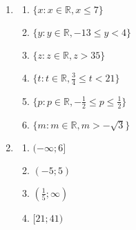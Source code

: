  \begin{solutions}{}{
\begin{enumerate}[itemsep=5pt, label=\textbf{\arabic*}. ] 
\item
\begin{multicols}{2}
\begin{enumerate}[noitemsep, label=\textbf{(\alph*)} ] 
 \item $\{x:x\in\mathbb{R}, x\leq7\}$ %
\item $\{y:y\in\mathbb{R}, -13 \leq y<4\}$ %
\item $\{z:z\in\mathbb{R}, z>35\}$ %
\item $\{t:t\in\mathbb{R}, \frac{3}{4}\leq t <21\}$ %
\item $\{p:p\in\mathbb{R}, -\frac{1}{2}\leq p \leq \frac{1}{2}\}$ %
\item $\{m:m\in\mathbb{R}, m > -\sqrt{3}\}$  %
\end{enumerate}
\end{multicols}
\item %
\begin{multicols}{2}
\begin{enumerate}[noitemsep, label=\textbf{(\alph*)} ] 
 \item $(-\infty; 6]$ %
 \item $(-5; 5)$ %
 \item $(\frac{1}{5}; \infty)$%
 \item $[21; 41)$%
\end{enumerate}
\end{multicols}
\end{enumerate}}
\end{solutions}


